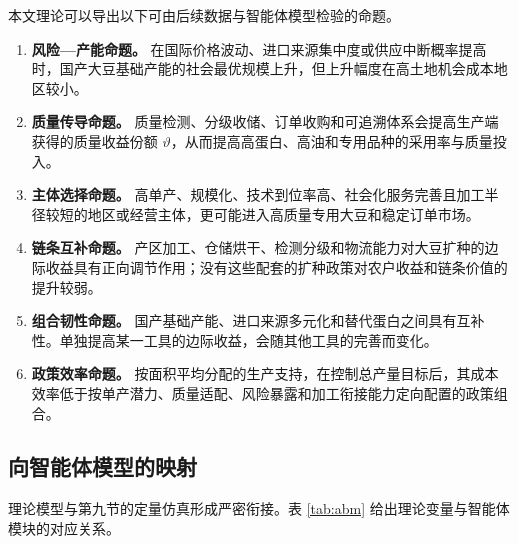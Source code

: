 \documentclass[UTF8,zihao=-4,fontset=fandol]{ctexart}
\numberwithin{equation}{section}
\theoremstyle{definition}
\theoremstyle{remark}
\begin{document}
本文理论可以导出以下可由后续数据与智能体模型检验的命题。

\begin{enumerate}[label=\textbf{H\arabic*.},leftmargin=3em]
 \item \textbf{风险—产能命题。} 在国际价格波动、进口来源集中度或供应中断概率提高时，国产大豆基础产能的社会最优规模上升，但上升幅度在高土地机会成本地区较小。
 \item \textbf{质量传导命题。} 质量检测、分级收储、订单收购和可追溯体系会提高生产端获得的质量收益份额 $\vartheta$，从而提高高蛋白、高油和专用品种的采用率与质量投入。
 \item \textbf{主体选择命题。} 高单产、规模化、技术到位率高、社会化服务完善且加工半径较短的地区或经营主体，更可能进入高质量专用大豆和稳定订单市场。
 \item \textbf{链条互补命题。} 产区加工、仓储烘干、检测分级和物流能力对大豆扩种的边际收益具有正向调节作用；没有这些配套的扩种政策对农户收益和链条价值的提升较弱。
 \item \textbf{组合韧性命题。} 国产基础产能、进口来源多元化和替代蛋白之间具有互补性。单独提高某一工具的边际收益，会随其他工具的完善而变化。
 \item \textbf{政策效率命题。} 按面积平均分配的生产支持，在控制总产量目标后，其成本效率低于按单产潜力、质量适配、风险暴露和加工衔接能力定向配置的政策组合。
\end{enumerate}

\subsection{向智能体模型的映射}

理论模型与第九节的定量仿真形成严密衔接。表 \ref{tab:abm} 给出理论变量与智能体模块的对应关系。
\end{document}
